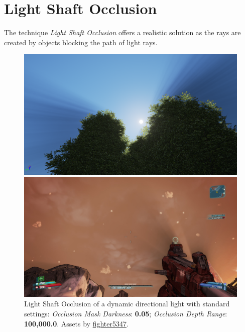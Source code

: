 \documentclass[A4]{article}
\begin{document}
	\clearpage
	
	\section*{Light Shaft Occlusion}
	The technique \textit{Light Shaft Occlusion} offers a realistic solution as the rays are created by objects blocking the path of light rays.
	\begin{figure}
		\begin{center}
			\vspace{-20px}
			\includegraphics[scale=0.13]{Occlusion.png}
			\vspace{-20px}
		\end{center}
		\caption{Light Shaft Occlusion of a dynamic directional light with standard settings: \textit{Occlusion Mask Darkness}: \textbf{0.05}; \textit{Occlusion Depth Range}: \textbf{100,000.0}. Assets by \href{https://forums.unrealengine.com/showthread.php?59812-FREE-Foliage-Starter-Kit}{fighter5347}.}
		\begin{center}
			\includegraphics[scale=0.07]{Borderlands.jpg}
		\end{center}

\end{figure}
\end{document}
